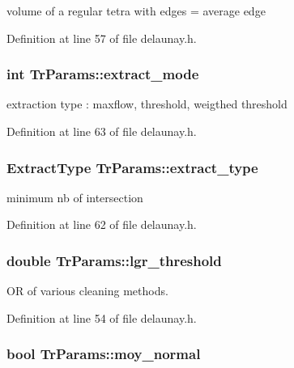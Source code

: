 volume of a regular tetra with edges = average edge 



Definition at line 57 of file delaunay.h.

\hypertarget{classTrParams_acf38c074b1af80dba366076f73d22f29}{
\subsubsection[{extract\_\-mode}]{\setlength{\rightskip}{0pt plus 5cm}int {\bf TrParams::extract\_\-mode}}}
\label{classTrParams_acf38c074b1af80dba366076f73d22f29}


extraction type : maxflow, threshold, weigthed threshold 



Definition at line 63 of file delaunay.h.

\hypertarget{classTrParams_a98a3411069cffa301444b893523d9c5c}{
\subsubsection[{extract\_\-type}]{\setlength{\rightskip}{0pt plus 5cm}ExtractType {\bf TrParams::extract\_\-type}}}
\label{classTrParams_a98a3411069cffa301444b893523d9c5c}


minimum nb of intersection 



Definition at line 62 of file delaunay.h.

\hypertarget{classTrParams_a72377e94872cb7e3ec1bc7936d51dfda}{
\subsubsection[{lgr\_\-threshold}]{\setlength{\rightskip}{0pt plus 5cm}double {\bf TrParams::lgr\_\-threshold}}}
\label{classTrParams_a72377e94872cb7e3ec1bc7936d51dfda}


OR of various cleaning methods. 



Definition at line 54 of file delaunay.h.

\hypertarget{classTrParams_a2ba40154349c0c124ca933439d0575b3}{
\subsubsection[{moy\_\-normal}]{\setlength{\rightskip}{0pt plus 5cm}bool {\bf TrParams::moy\_\-normal}}}
\label{classTrParams_a2ba40154349c0c124ca933439d0575b3}


